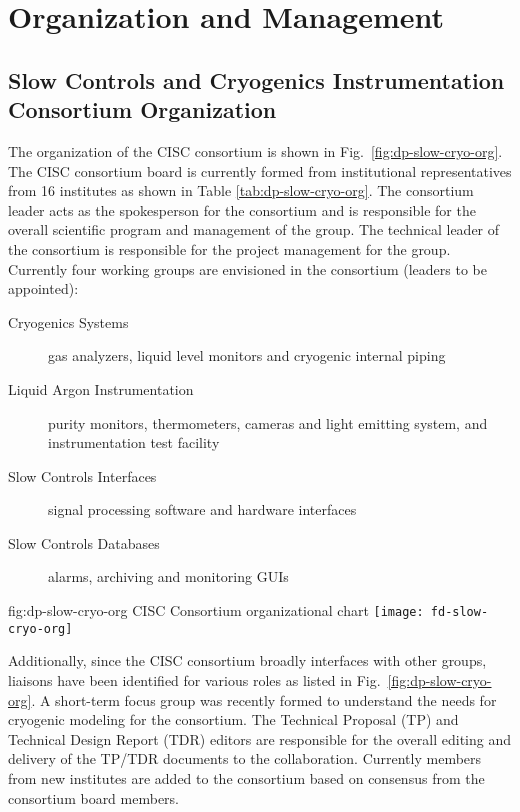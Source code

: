 \section{Organization and Management}
\label{sec:fddp-slow-cryo-org}


\subsection{Slow Controls and Cryogenics Instrumentation Consortium Organization}
\label{sec:fddp-slow-cryo-org-consortium}


The organization of the CISC consortium is shown in
Fig.\ \ref{fig:dp-slow-cryo-org}. The CISC consortium board is
currently formed from institutional representatives from 16 institutes
as shown in Table \ref{tab:dp-slow-cryo-org}. The consortium leader
acts as the spokesperson for the consortium and is responsible for the
overall scientific program and management of the group. The technical
leader of the consortium is responsible for the project management for
the group.  Currently four working groups are envisioned in the
consortium (leaders to be appointed):

\begin{description}
 \item[Cryogenics Systems] gas analyzers, liquid level
  monitors and cryogenic internal piping
 \item[Liquid Argon Instrumentation] purity monitors, thermometers,
  cameras and light emitting system, and instrumentation test facility
 \item[Slow Controls Interfaces] signal processing software and
  hardware interfaces
 \item[Slow Controls Databases] alarms, archiving and monitoring GUIs
\end{description}

\begin{dunefigure}{fig:dp-slow-cryo-org}
{CISC Consortium organizational chart}
\texttt{[image: fd-slow-cryo-org]}
\end{dunefigure}

Additionally, since the CISC consortium broadly interfaces with other
groups, liaisons have been identified for various roles as listed in
Fig.\ \ref{fig:dp-slow-cryo-org}. A short-term focus group was
recently formed to understand the needs for cryogenic modeling for the
consortium. The Technical Proposal (TP) and Technical Design Report
(TDR) editors are responsible for the overall editing and delivery of
the TP/TDR documents to the collaboration. Currently members from new
institutes are added to the consortium based on consensus from the
consortium board members.

